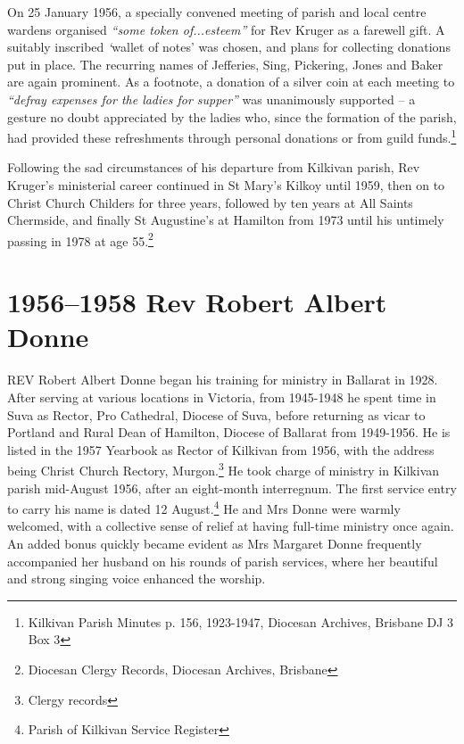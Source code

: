 \balance


On 25 January 1956, a specially convened meeting of parish and local centre wardens organised \emph{``some token of...esteem''} for Rev Kruger as a farewell gift. A suitably inscribed \emph{`}wallet of notes' was chosen, and plans for collecting donations put in place. The recurring names of Jefferies, Sing, Pickering, Jones and Baker are again prominent. As a footnote, a donation of a silver coin at each meeting to \emph{``defray expenses for the ladies for supper''} was unanimously supported -- a gesture no doubt appreciated by the ladies who, since the formation of the parish, had provided these refreshments through personal donations or from guild funds.\footnote{Kilkivan Parish Minutes p. 156, 1923-1947, Diocesan Archives, Brisbane DJ 3 Box 3}


Following the sad circumstances of his departure from Kilkivan parish, Rev Kruger's ministerial career continued in St Mary's Kilkoy until 1959, then on to Christ Church Childers for three years, followed by ten years at All Saints Chermside, and finally St Augustine's at Hamilton from 1973 until his untimely passing in 1978 at age 55.\footnote{Diocesan Clergy Records, Diocesan Archives, Brisbane}


\printendnotes[custom]
\setcounter{endnote}{0}




\chapter{1956--1958 Rev Robert Albert Donne}
\nobalance


\lettrine[lines=3]{R}{EV}
 Robert Albert Donne began his training for ministry in Ballarat in 1928. After serving at various locations in Victoria, from 1945-1948 he spent time in Suva as Rector, Pro Cathedral, Diocese of Suva, before returning as vicar to Portland and Rural Dean of Hamilton, Diocese of Ballarat from 1949-1956. He is listed in the 1957 Yearbook as Rector of Kilkivan from 1956, with the address being Christ Church Rectory, Murgon.\footnote{Clergy records} He took charge of ministry in Kilkivan parish mid-August 1956, after an eight-month interregnum. The first service entry to carry his name is dated 12 August.\footnote{Parish of Kilkivan Service Register} He and Mrs Donne were warmly welcomed, with a collective sense of relief at having full-time ministry once again. An added bonus quickly became evident as Mrs Margaret Donne frequently accompanied her husband on his rounds of parish services, where her beautiful and strong singing voice enhanced the worship.








